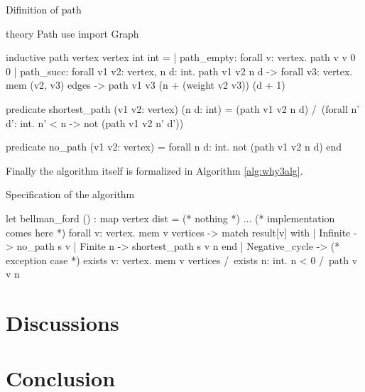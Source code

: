\documentclass[a4paper,12pt]{article}
\begin{document}
\begin{algorithm}
\caption{Difinition of path}\label{alg:why3path}
\begin{why3}
theory Path
  use import Graph

  inductive path vertex vertex int int =
    | path_empty:
        forall v: vertex. path v v 0 0
    | path_succ:
        forall v1 v2: vertex, n d: int. path v1 v2 n d ->
        forall v3: vertex. mem (v2, v3) edges ->
        path v1 v3 (n + (weight v2 v3)) (d + 1)

  predicate shortest_path (v1 v2: vertex) (n d: int) =
    (path v1 v2 n d) /\
    (forall n' d': int. n' < n -> not (path v1 v2 n' d'))

  predicate no_path (v1 v2: vertex) =
    forall n d: int. not (path v1 v2 n d)
end
\end{why3}
\end{algorithm}

Finally the algorithm itself is formalized in Algorithm \ref{alg:why3alg}.

\begin{algorithm}
\caption{Specification of the algorithm}\label{alg:why3alg}
\begin{why3}
let bellman_ford () : map vertex dist =
  { (* nothing *) }
  ... (* implementation comes here *)
  { forall v: vertex. mem v vertices ->
    match result[v] with
    | Infinite -> no_path s v
    | Finite n -> shortest_path s v n
    end }
  | Negative_cycle -> (* exception case *)
  { exists v: vertex. mem v vertices /\
    exists n: int. n < 0 /\ path v v n }
\end{why3}
\end{algorithm}






\section{Discussions}


\section{Conclusion}





\end{document}
